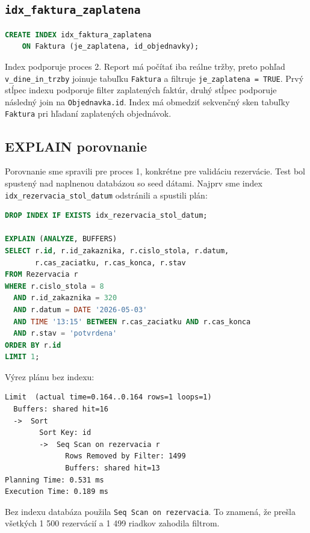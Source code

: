 \documentclass[11pt, a4paper]{article}
\begin{document}
\subsection*{\texttt{idx\_faktura\_zaplatena}}

\begin{lstlisting}[language=SQL]
CREATE INDEX idx_faktura_zaplatena
    ON Faktura (je_zaplatena, id_objednavky);
\end{lstlisting}

Index podporuje proces 2. Report má počítať iba reálne tržby, preto pohľad
\texttt{v\_dine\_in\_trzby} joinuje tabuľku \texttt{Faktura} a filtruje
\texttt{je\_zaplatena = TRUE}. Prvý stĺpec indexu podporuje filter zaplatených faktúr, druhý stĺpec
podporuje následný join na \texttt{Objednavka.id}. Index má obmedziť sekvenčný sken tabuľky
\texttt{Faktura} pri hľadaní zaplatených objednávok.

\subsection*{EXPLAIN porovnanie}

Porovnanie sme spravili pre proces 1, konkrétne pre validáciu rezervácie. Test bol spustený nad
naplnenou databázou so seed dátami. Najprv sme index \texttt{idx\_rezervacia\_stol\_datum}
odstránili a spustili plán:

\begin{lstlisting}[language=SQL]
DROP INDEX IF EXISTS idx_rezervacia_stol_datum;

EXPLAIN (ANALYZE, BUFFERS)
SELECT r.id, r.id_zakaznika, r.cislo_stola, r.datum,
       r.cas_zaciatku, r.cas_konca, r.stav
FROM Rezervacia r
WHERE r.cislo_stola = 8
  AND r.id_zakaznika = 320
  AND r.datum = DATE '2026-05-03'
  AND TIME '13:15' BETWEEN r.cas_zaciatku AND r.cas_konca
  AND r.stav = 'potvrdena'
ORDER BY r.id
LIMIT 1;
\end{lstlisting}

Výrez plánu bez indexu:

\begin{lstlisting}
Limit  (actual time=0.164..0.164 rows=1 loops=1)
  Buffers: shared hit=16
  ->  Sort
        Sort Key: id
        ->  Seq Scan on rezervacia r
              Rows Removed by Filter: 1499
              Buffers: shared hit=13
Planning Time: 0.531 ms
Execution Time: 0.189 ms
\end{lstlisting}

Bez indexu databáza použila \texttt{Seq Scan on rezervacia}. To znamená, že prešla všetkých
1 500 rezervácií a 1 499 riadkov zahodila filtrom.
\end{document}
